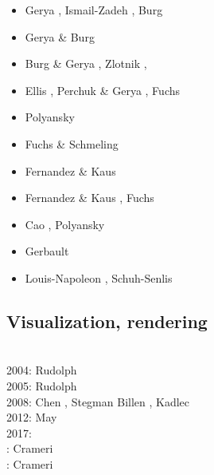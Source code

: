 \begin{scriptsize}
\begin{itemize}
\item[\twothousandfour] Gerya \etal \cite{gepm04,geur04}, Ismail-Zadeh \etal \cite{istt04},
                        Burg \etal \cite{bukp04}
\item[\twothousandseven] Gerya \& Burg \cite{gebu07}
\item[\twothousandeight] Burg \& Gerya \cite{buge08}, Zlotnik \etal \cite{zlfd08},
\item[\twothousandeleven] Ellis \etal \cite{ellw11}, Perchuk \& Gerya \cite{pege11},
                          Fuchs \etal \cite{fusk11}
\item[\twothousandtwelve] Polyansky \etal \cite{pokb12}
\item[\twothousandthirteen] Fuchs \& Schmeling \cite{fusc13}
\item[\twothousandfourteen] Fernandez \& Kaus \cite{feka14b}
\item[\twothousandfifteen] Fernandez \& Kaus \cite{feka15}, Fuchs \etal \cite{fuks15}
\item[\twothousandsixteen] Cao \etal \cite{cakp16}, Polyansky \etal \cite{porb16}
\item[\twothousandeighteen] Gerbault \etal \cite{gesr18}
\item[\twothousandtwenty] Louis-Napoleon \etal \cite{logb20}, Schuh-Senlis \etal \cite{sctc20}
\end{itemize}
\end{scriptsize}

\subsection{Visualization, rendering}

\begin{scriptsize}
\cite{faha}\\
2004: Rudolph \etal \cite{rugy04}\\
2005: Rudolph \etal \cite{rugy05}\\
2008: Chen \etal \cite{chzy08}, Stegman \etal \cite{stmt08}
      Billen \etal \cite{bikh08}, Kadlec \etal \cite{kadt08}\\
2012: May \cite{may12}\\
2017: \cite{krke17}\\
\twothousandeighteen: Crameri \cite{cram18}\\
\twothousandtwenty: Crameri \etal \cite{crsh20}
\end{scriptsize}

